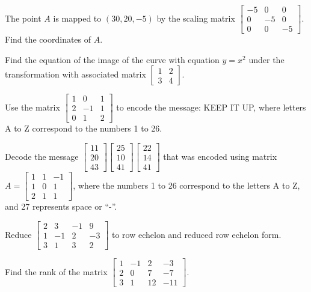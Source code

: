 \documentclass[11pt,a4paper]{article}
\begin{document}
\begin{longlist}
\item The point $A$ is mapped to $(30,20,-5)$ by the scaling matrix $\begin{bmatrix}-5&0&0\\0&-5&0\\0&0&-5\end{bmatrix}$. Find the coordinates of $A$.

\item Find the equation of the image of the curve with equation $y=x^2$ under the transformation with associated matrix $\begin{bmatrix}1&2\\3&4\end{bmatrix}$.

\item Use the matrix $\begin{bmatrix}1&0&1\\2&-1&1\\0&1&2\end{bmatrix}$ to encode the message: KEEP IT UP, where letters A to Z correspond to the numbers 1 to 26.

\item Decode the message $\begin{bmatrix}11\\20\\43\end{bmatrix}\begin{bmatrix}25\\10\\41\end{bmatrix}\begin{bmatrix}22\\14\\41\end{bmatrix}$ that was encoded using matrix $A=\begin{bmatrix}1&1&-1\\1&0&1\\2&1&1\end{bmatrix}$, where the numbers 1 to 26 correspond to the letters A to Z, and 27 represents space or ``-''.

\item Reduce $\begin{bmatrix}2&3&-1&9\\1&-1&2&-3\\3&1&3&2\end{bmatrix}$ to row echelon and reduced row echelon form.

\item Find the rank of the matrix $\begin{bmatrix}1&-1&2&-3\\2&0&7&-7\\3&1&12&-11\end{bmatrix}$.


\end{longlist}
\end{document}
